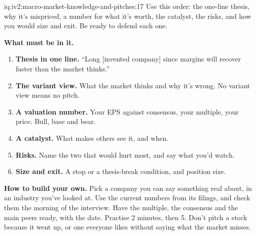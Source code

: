 \begin{solution}{iq:iv2:macro-market-knowledge-and-pitches:17}
Use this order: the one-line thesis, why it's mispriced, a number for what it's worth, the catalyst, the risks, and how you would size and exit. Be ready to defend each one.

\textbf{What must be in it.}
\begin{enumerate}
\item \textbf{Thesis in one line.} ``Long [invented company] since margins will recover faster than the market thinks.''
\item \textbf{The variant view.} What the market thinks and why it's wrong. No variant view means no pitch.
\item \textbf{A valuation number.} Your EPS against consensus, your multiple, your price. Bull, base and bear.
\item \textbf{A catalyst.} What makes others see it, and when.
\item \textbf{Risks.} Name the two that would hurt most, and say what you'd watch.
\item \textbf{Size and exit.} A stop or a thesis-break condition, and position size.
\end{enumerate}

\textbf{How to build your own.} Pick a company you can say something real about, in an industry you've looked at. Use the current numbers from its filings, and check them the morning of the interview. Have the multiple, the consensus and the main peers ready, with the date. Practise 2 minutes, then 5. Don't pitch a stock because it went up, or one everyone likes without saying what the market misses.

\end{solution}


